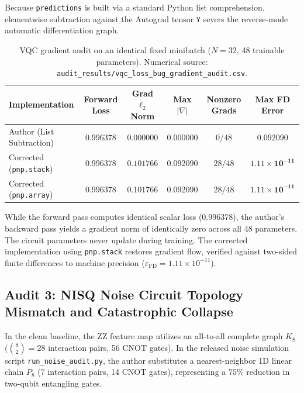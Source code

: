 Because \texttt{predictions} is built via a standard Python list comprehension, elementwise subtraction against the Autograd tensor \texttt{Y} severs the reverse-mode automatic differentiation graph.

\begin{table}[H]
\centering
\small
\caption{VQC gradient audit on an identical fixed minibatch ($N=32$, 48 trainable parameters). Numerical source: \texttt{audit\_results/vqc\_loss\_bug\_gradient\_audit.csv}.}
\label{tab:vqc-grad-audit}
\begin{tabularx}{\textwidth}{lccccc}
\toprule
\textbf{Implementation} & \textbf{Forward Loss} & \textbf{Grad $\ell_2$ Norm} & \textbf{Max $|\nabla|$} & \textbf{Nonzero Grads} & \textbf{Max FD Error} \\
\midrule
Author (List Subtraction) & 0.996378 & $\mathbf{0.000000}$ & $0.000000$ & $0 / 48$ & $0.092090$ \\
Corrected (\texttt{pnp.stack}) & 0.996378 & $\mathbf{0.101766}$ & $0.092090$ & $28 / 48$ & $\mathbf{1.11 \times 10^{-11}}$ \\
Corrected (\texttt{pnp.array}) & 0.996378 & $\mathbf{0.101766}$ & $0.092090$ & $28 / 48$ & $\mathbf{1.11 \times 10^{-11}}$ \\
\bottomrule
\end{tabularx}
\end{table}

While the forward pass computes identical scalar loss ($0.996378$), the author's backward pass yields a gradient norm of identically zero across all 48 parameters. The circuit parameters never update during training. The corrected implementation using \texttt{pnp.stack} restores gradient flow, verified against two-sided finite differences to machine precision ($\varepsilon_{\mathrm{FD}} = 1.11 \times 10^{-11}$).

\subsection{Audit 3: NISQ Noise Circuit Topology Mismatch and Catastrophic Collapse}
In the clean baseline, the ZZ feature map utilizes an all-to-all complete graph $K_8$ ($\binom{8}{2} = 28$ interaction pairs, 56 CNOT gates). In the released noise simulation script \texttt{run\_noise\_audit.py}, the author substitutes a nearest-neighbor 1D linear chain $P_8$ ($7$ interaction pairs, 14 CNOT gates), representing a $75\%$ reduction in two-qubit entangling gates.

